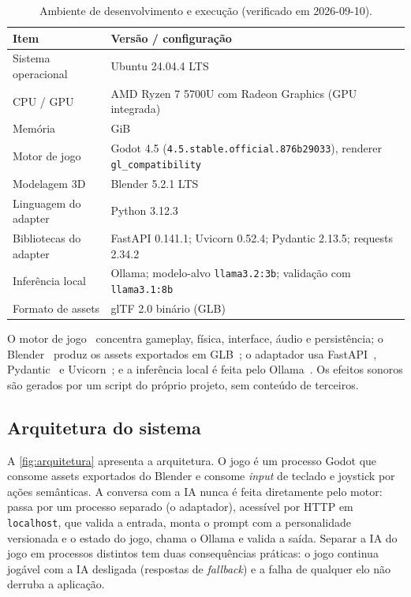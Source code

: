 \begin{table}[H]
\centering
\caption{Ambiente de desenvolvimento e execução (verificado em 2026-09-10).}
\label{tab:ambiente}
\begin{tabular}{@{}>{\raggedright\arraybackslash}p{38mm}>{\raggedright\arraybackslash}p{104mm}@{}}
\toprule
Item & Versão / configuração \\
\midrule
Sistema operacional & Ubuntu 24.04.4 LTS \\
CPU / GPU & AMD Ryzen 7 5700U com Radeon Graphics (GPU integrada) \\
Memória & 30 GiB \\
Motor de jogo & Godot 4.5 (\texttt{4.5.stable.official.876b29033}), renderer \texttt{gl\_compatibility} \\
Modelagem 3D & Blender 5.2.1 LTS \\
Linguagem do adapter & Python 3.12.3 \\
Bibliotecas do adapter & FastAPI 0.141.1; Uvicorn 0.52.4; Pydantic 2.13.5; requests 2.34.2 \\
Inferência local & Ollama; modelo-alvo \texttt{llama3.2:3b}; validação com \texttt{llama3.1:8b} \\
Formato de assets & glTF 2.0 binário (GLB) \\
\bottomrule
\end{tabular}
\end{table}

O motor de jogo~\citep{godot2026} concentra gameplay, física, interface, áudio e
persistência; o Blender~\citep{blender2026} produz os assets exportados em
GLB~\citep{khronos2026gltf}; o adaptador usa
FastAPI~\citep{fastapi2026}, Pydantic~\citep{pydantic2026} e
Uvicorn~\citep{uvicorn2026}; e a inferência local é feita pelo
Ollama~\citep{ollama2026}. Os efeitos sonoros são gerados por um script do
próprio projeto, sem conteúdo de terceiros.

\subsection{Arquitetura do sistema}

A \autoref{fig:arquitetura} apresenta a arquitetura. O jogo é um processo
Godot que consome assets exportados do Blender e consome \emph{input} de
teclado e joystick por ações semânticas. A conversa com a IA nunca é feita
diretamente pelo motor: passa por um processo separado (o adaptador), acessível
por HTTP em \texttt{localhost}, que valida a entrada, monta o prompt com a
personalidade versionada e o estado do jogo, chama o Ollama e valida a saída.
Separar a IA do jogo em processos distintos tem duas consequências práticas:
o jogo continua jogável com a IA desligada (respostas de \emph{fallback}) e a
falha de qualquer elo não derruba a aplicação.

